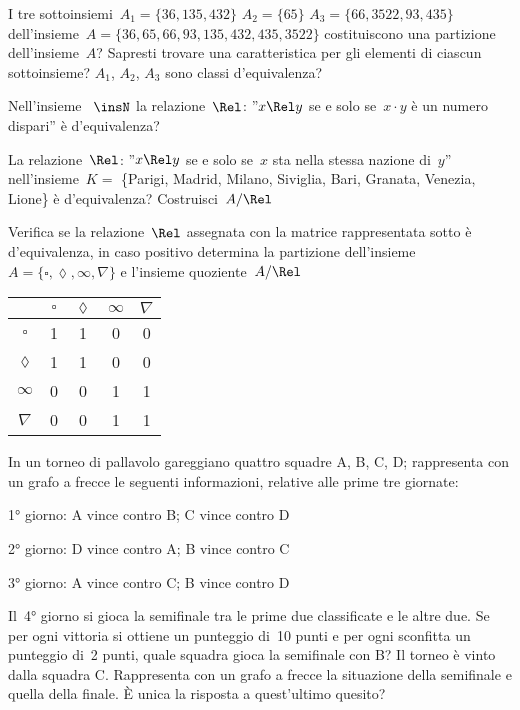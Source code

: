 \begin{multicols}{2}
\begin{esercizio}
\label{ese:B.54}
I tre sottoinsiemi~$A_1 = \{ 36, 135, 432 \}$ 
$A_2 = \{ 65 \}$ $A_3 = \{ 66, 3522, 93, 435 \}$
dell'insieme~$A = \{ 36, 65, 66, 93, 135, 432, 435, 3522 \}$ 
costituiscono una partizione dell'insieme~$A$? Sapresti trovare una 
caratteristica per gli elementi di ciascun sottoinsieme? 
$A_1$, $A_2$, $A_3$ sono classi d'equivalenza?
\end{esercizio}

\begin{esercizio}
\label{ese:B.55}
Nell'insieme ~$\insN$ la relazione~$\Rel$: 
''$x \Rel y$ se e solo se~$x \cdot y$ è un numero dispari'' è d'equivalenza?
\end{esercizio}

\begin{esercizio}
\label{ese:B.56}
La relazione~$\Rel$: 
''$x \Rel y$ se e solo se~$x$ sta nella stessa nazione di~$y$'' 
nell'insieme~$K=$ \{Parigi, Madrid, Milano, Siviglia, Bari, Granata, 
Venezia, Lione\}
è d'equivalenza? Costruisci~$A/\Rel$
\end{esercizio}

\begin{esercizio}
\label{ese:B.57}
Verifica se la relazione~$\Rel$ assegnata con la matrice rappresentata
sotto è d'equivalenza, in caso positivo determina la partizione 
dell'insieme~$A =\{\square, \lozenge, \infty, \nabla\}$ e l'insieme
quoziente~$A/\Rel$

\begin{center}
\begin{tabular}{ccccc}
\toprule
 & $\square$ & $\lozenge$ & $\infty$ & $\nabla$\\
\midrule
 $\square$ & 1 & 1 & 0 & 0 \\
 $\lozenge$ & 1 & 1 & 0 & 0 \\
 $\infty$ & 0 & 0 & 1 & 1\\
 $\nabla$ & 0 & 0 & 1 & 1\\
\bottomrule
\end{tabular}
\end{center}
\end{esercizio}

\begin{esercizio}
\label{ese:B.58}
In un torneo di pallavolo gareggiano quattro squadre A, B, C, D; rappresenta 
con un grafo a frecce le seguenti informazioni, relative alle prime tre 
giornate:
\begin{itemize*}
\item 1° giorno: A vince contro B; C vince contro D
\item 2° giorno: D vince contro A; B vince contro C
\item 3° giorno: A vince contro C; B vince contro D
\end{itemize*}
Il~4° giorno si gioca la semifinale tra le prime due classificate e le altre 
due. 
Se per ogni vittoria si ottiene un punteggio di~10 punti e per ogni sconfitta 
un punteggio di~2 punti, quale squadra gioca la semifinale con B?
Il torneo è vinto dalla squadra C. Rappresenta con un grafo a frecce la 
situazione della semifinale e quella della finale. 
È unica la risposta a quest'ultimo quesito?
\end{esercizio}


\end{multicols}
